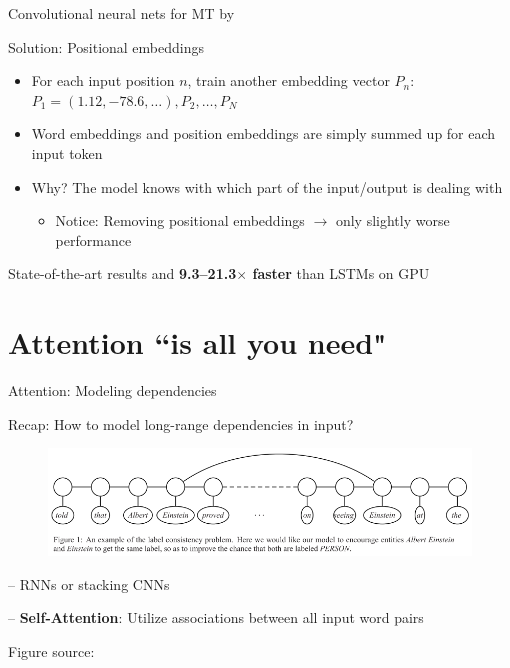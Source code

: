 \documentclass[12pt,aspectratio=169,handout]{beamer}
\begin{document}
\begin{frame}{Convolutional neural nets for MT by \citet{Gehring.et.al.2017a.ICML}}
	
	Solution: Positional embeddings
	
	\begin{itemize}
		\item For each input position $n$, train another embedding vector $P_n$: $P_1 = (1.12, -78.6, \dots), P_2, \dots, P_N$
		
		\item Word embeddings and position embeddings are simply summed up for each input token
		
		\item Why? The model knows with which part of the input/output is dealing with
		
		\begin{itemize}
			\item Notice: Removing positional embeddings $\to$ only slightly worse performance
		\end{itemize}
		
		
	\end{itemize}
	
	
	State-of-the-art results and \textbf{9.3--21.3$\times$ faster} than LSTMs on GPU
	
\end{frame}

\section{Attention ``is all you need"}

\begin{frame}{Attention: Modeling dependencies}
	
	Recap: How to model long-range dependencies in input?
	
	\begin{figure}
		\includegraphics[width=0.95\linewidth]{img/long-deps.png}
	\end{figure}
	
	
	-- RNNs or stacking CNNs
	
	-- \textbf{Self-Attention}: Utilize associations between all input word pairs
	
	\begin{scriptsize}
		Figure source: 
	\end{scriptsize}
	
\end{frame}
\end{document}

